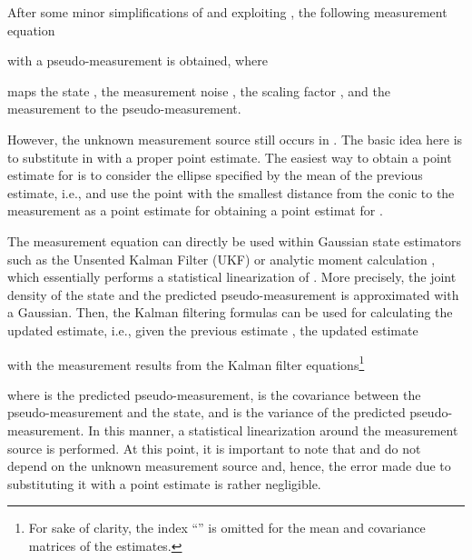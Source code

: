 \documentclass[preprint,1p,11pt]{ISAS_IR}
\begin{document}
After some minor simplifications  of  and exploiting , the following measurement equation  

with a  pseudo-measurement  is obtained, where 

maps the state ,  the measurement noise , the scaling factor , and the measurement  to the pseudo-measurement.

However,   the unknown measurement source  still occurs in .  The basic idea here is to substitute    in  with a proper point estimate. The easiest way to obtain a point estimate for  is to consider the  ellipse specified by the mean of the previous estimate, i.e.,   and use  the point with the smallest distance from the conic to the measurement  as a point estimate for obtaining  a point estimat for  .


The measurement equation  can  directly be used within Gaussian state estimators such as the Unsented Kalman Filter (UKF) \cite{Julier_UnscentedFiltering} or analytic moment calculation \cite{Fusion11_Baum}, which essentially performs a statistical linearization of  . More precisely,  the  joint density of the state and the predicted pseudo-measurement is approximated with a Gaussian. Then, the Kalman filtering \cite{Bar-Shalom2002} formulas can be used for calculating the updated estimate, i.e., 
given the  previous estimate , the updated estimate 

 with the measurement  results from the Kalman filter
equations\footnote{For sake of clarity, the index ``''  is omitted for the mean and covariance matrices of the estimates.}

where    is the predicted pseudo-measurement,  is the  covariance between the pseudo-measurement and   the state,  and  is the variance of the predicted pseudo-measurement.
In this manner, a statistical linearization around the measurement source is performed.
 At this point, it is important to note that  and   do  not depend on the unknown measurement source  and, hence, the error made due to substituting it with a point estimate is rather negligible.
\end{document}
